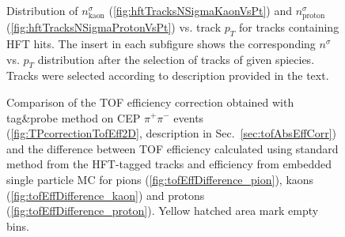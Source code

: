 \begin{figure}[hb]
{\begin{subfigure}[b]{\linewidth}
  \end{subfigure}
}%
\caption[Distribution of $n^{\sigma}$ (kaon and proton) vs. transverse momentum for tracks containing HFT hits.]%
    {Distribution of $n^{\sigma}_{\text{kaon}}$ (\ref{fig:hftTracksNSigmaKaonVsPt}) and $n^{\sigma}_{\text{proton}}$ (\ref{fig:hftTracksNSigmaProtonVsPt}) vs. track $p_{T}$ for tracks containing HFT hits. The insert in each subfigure shows the corresponding $n^{\sigma}$ vs. $p_{T}$ distribution after the selection of tracks of given spiecies. Tracks were selected according to description provided in the text.}\label{fig:hftTracksNSigmaVsPt}%
\end{figure}


\begin{figure}[h!]%
\centering
\parbox{0.31\textwidth}{
  \centering
  \begin{subfigure}[b]{\linewidth}{
                }
  \end{subfigure} 
} 
\quad
\parbox{0.65\textwidth}{ 
  \centering
		\begin{minipage}[t][0.64\linewidth][t]{\linewidth}\vspace{30pt}
			\caption[Comparison of the TOF eff. correction from tag\&probe method and the difference between TOF eff. calculated using standard method from the HFT-tagged tracks and efficiency from embedded single particle MC.]%
    {Comparison of the TOF efficiency correction obtained with tag\&probe method on CEP $\pi^{+}\pi^{-}$ events (\ref{fig:TPcorrectionTofEff2D}, description in Sec.~\ref{sec:tofAbsEffCorr}) and the difference between TOF efficiency calculated using standard method from the HFT-tagged tracks and efficiency from embedded single particle MC for pions (\ref{fig:tofEffDifference_pion}), kaons (\ref{fig:tofEffDifference_kaon}) and protons (\ref{fig:tofEffDifference_proton}). Yellow hatched area mark empty bins.}\label{fig:tofEffSystematics2DComparison}%

\end{minipage}}
\end{figure}
